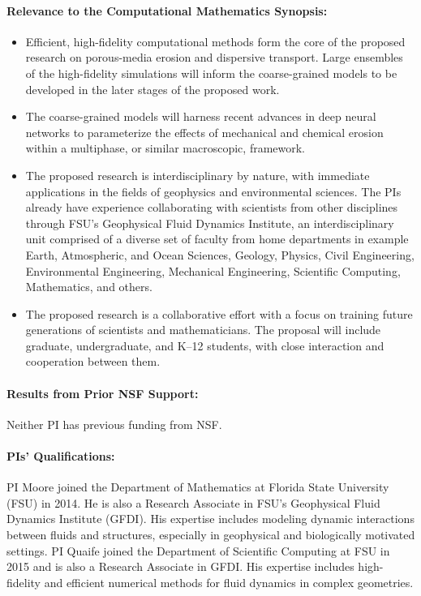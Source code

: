 \documentclass[11pt]{article}
\begin{document}
\paragraph{Relevance to the Computational Mathematics Synopsis:}
\begin{itemize}[noitemsep]
  \item Efficient, high-fidelity computational methods form the core of the proposed research on porous-media erosion and dispersive transport. Large ensembles of the high-fidelity simulations will inform the coarse-grained models to be developed in the later stages of the proposed work.

\item The coarse-grained models will harness recent advances in deep neural networks \cite{ling2016reynolds, kutz2017deep, ling2016machine, pelt2018mixed} to parameterize the effects of mechanical and chemical erosion within a multiphase\cite{breward2003multiphase, cogan2010multiphase, Imma2019, eastham2019multiphase}, or similar macroscopic, framework.

  \item The proposed research is interdisciplinary by nature, with immediate applications in the fields of geophysics and environmental sciences. The PIs already have experience collaborating with scientists from other disciplines \cite{Caves2018, eastham2019multiphase, Bolles2019, cur-spe-hie-obr-goo-qua2018} through FSU's Geophysical Fluid Dynamics Institute, an interdisciplinary unit comprised of a diverse set of faculty from home departments in example Earth, Atmospheric, and Ocean Sciences, Geology, Physics, Civil Engineering, Environmental Engineering, Mechanical Engineering, Scientific Computing, Mathematics, and others.  

  \item The proposed research is a collaborative effort with a focus on training future generations of scientists and mathematicians. The proposal will include graduate, undergraduate, and K--12 students, with close interaction and cooperation between them.
\end{itemize}

\paragraph{Results from Prior NSF Support:} Neither PI has previous funding from NSF.

\paragraph{PIs' Qualifications:} PI Moore joined the Department of Mathematics at Florida State University (FSU) in 2014. He is also a Research Associate in FSU's Geophysical Fluid Dynamics Institute (GFDI).  His expertise includes modeling dynamic interactions between fluids and structures, especially in geophysical and biologically motivated settings. PI Quaife joined the Department of Scientific Computing at FSU in 2015 and is also a Research Associate in GFDI. His expertise includes high-fidelity and efficient numerical methods for fluid dynamics in complex geometries.
\end{document}
